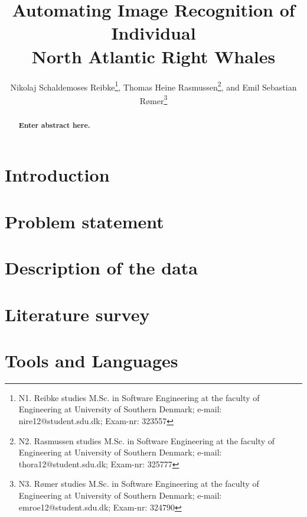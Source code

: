 \documentclass[10pt,a4paper,twocolumn]{article}
\begin{document}
\title{\textbf{Automating Image Recognition of Individual \\ North Atlantic Right Whales}}

\author{Nikolaj Schaldemoses Reibke\thanks{N1. Reibke studies M.Sc. in Software Engineering at the faculty of Engineering at University of Southern Denmark; e-mail: nire12@student.sdu.dk; Exam-nr: 323557},
		Thomas Heine Rasmussen\thanks{N2. Rasmussen studies M.Sc. in Software Engineering at the faculty of Engineering at University of Southern Denmark; e-mail: thora12@student.sdu.dk; Exam-nr: 325777},
        and Emil Sebastian R{\o}mer\thanks{N3. R{\o}mer studies M.Sc. in Software Engineering at the faculty of Engineering at University of Southern Denmark; e-mail: emroe12@student.sdu.dk; Exam-nr: 324790}
}

\maketitle

\begin{abstract}
\textbf{Enter abstract here.}
\end{abstract}

\section{Introduction}


\section{Problem statement}
\label{sec:problem-statement}


\section{Description of the data}
\label{sec:descr-of-data}


\section{Literature survey}


\section{Tools and Languages}

\end{document}
